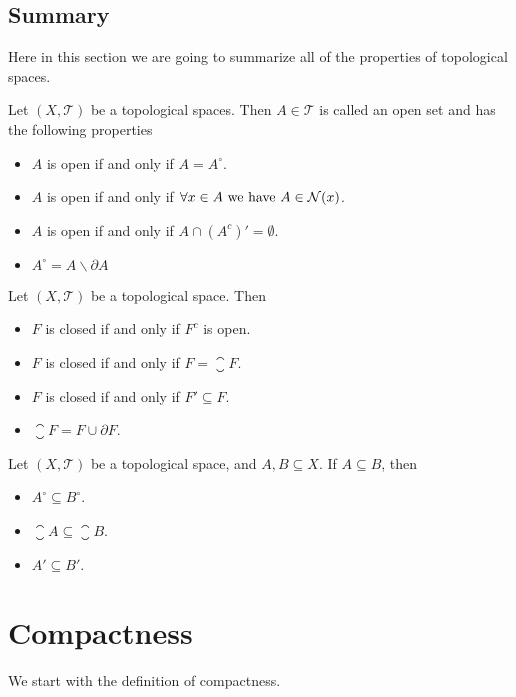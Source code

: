 \subsection{Summary}
Here in this section we are going to summarize all of the properties of topological spaces.

\begin{summary}
	Let $(X,\mathcal{T})$ be a topological spaces. Then $A \in \mathcal{T}$ is called an open set and has the following properties
	\begin{itemize}
		\item $A$ is open if and only if $A = A^\circ$.
		\item $A$ is open if and only if $\forall x \in A \ \text{we have}\  A \in \mathcal{N}(x)$.
		\item $A$ is open if and only if $A \cap (A^c)' = \emptyset$.
		\item $A^\circ = A \backslash \partial A$
	\end{itemize}
\end{summary}

\begin{summary}
	Let $(X,\mathcal{T})$ be a topological space. Then
	\begin{itemize}
		\item $F$ is closed if and only if $F^c$ is open.
		\item $F$ is closed if and only if $F = \closure{F}$.
		\item $F$ is closed if and only if $F' \subseteq F$.
		\item $\closure{F} = F \cup \partial F$. 
	\end{itemize}
\end{summary}

\begin{summary}
	Let $(X,\mathcal{T})$ be a topological space, and $A,B \subseteq X$. If $A \subseteq B$, then 
	\begin{itemize}
		\item $A^\circ \subseteq B^\circ$.
		\item $\closure{A} \subseteq \closure{B}$.
		\item $A' \subseteq B'$.
	\end{itemize}
\end{summary}


\section{Compactness}
We start with the definition of compactness.

